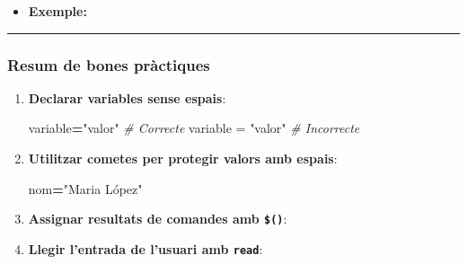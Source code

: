 \documentclass[
  12 pt,
  a4paper,
]{article}
\newenvironment{Shaded}{\begin{snugshade}}{\end{snugshade}}
\newcommand{\BuiltInTok}[1]{#1}
\newcommand{\CommentTok}[1]{\textcolor[rgb]{0.56,0.35,0.01}{\textit{#1}}}
\newcommand{\ExtensionTok}[1]{#1}
\newcommand{\FunctionTok}[1]{\textcolor[rgb]{0.13,0.29,0.53}{\textbf{#1}}}
\newcommand{\NormalTok}[1]{#1}
\newcommand{\OperatorTok}[1]{\textcolor[rgb]{0.81,0.36,0.00}{\textbf{#1}}}
\newcommand{\StringTok}[1]{\textcolor[rgb]{0.31,0.60,0.02}{#1}}
\newcommand{\VariableTok}[1]{\textcolor[rgb]{0.00,0.00,0.00}{#1}}
\begin{document}
\begin{itemize}
\item
  \textbf{Exemple:}

\begin{Shaded}
\end{Shaded}
\end{itemize}

\begin{center}\rule{0.5\linewidth}{0.5pt}\end{center}

\subsubsection{\texorpdfstring{\textbf{Resum de bones
pràctiques}}{Resum de bones pràctiques}}\label{resum-de-bones-pruxe0ctiques}

\begin{enumerate}
\def\labelenumi{\arabic{enumi}.}
\item
  \textbf{Declarar variables sense espais}:

\begin{Shaded}
\begin{Highlighting}[]
\VariableTok{variable}\OperatorTok{=}\StringTok{"valor"} \CommentTok{\# Correcte}
\ExtensionTok{variable}\NormalTok{ = }\StringTok{"valor"} \CommentTok{\# Incorrecte}
\end{Highlighting}
\end{Shaded}
\item
  \textbf{Utilitzar cometes per protegir valors amb espais}:

\begin{Shaded}
\begin{Highlighting}[]
\VariableTok{nom}\OperatorTok{=}\StringTok{"Maria López"}
\end{Highlighting}
\end{Shaded}
\item
  \textbf{Assignar resultats de comandes amb \texttt{\$()}}:

\begin{Shaded}
\end{Shaded}
\item
  \textbf{Llegir l'entrada de l'usuari amb \texttt{read}}:

\begin{Shaded}
\end{Shaded}
\end{enumerate}
\end{document}
